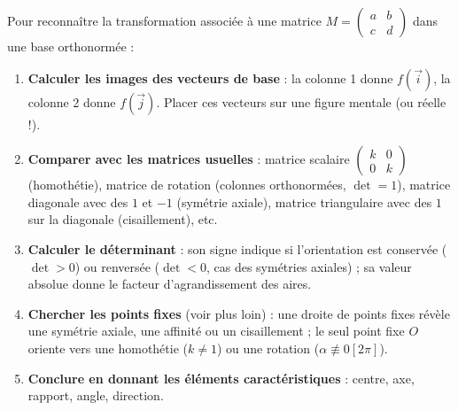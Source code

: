 \documentclass[11pt]{article}
\begin{document}
\begin{methode}
Pour reconnaître la transformation associée à une matrice $M = \begin{pmatrix} a & b \\ c & d \end{pmatrix}$ dans une base orthonormée :
\begin{enumerate}
\item \textbf{Calculer les images des vecteurs de base} : la colonne 1 donne $f(\vec{i})$, la colonne 2 donne $f(\vec{j})$. Placer ces vecteurs sur une figure mentale (ou réelle !).
\item \textbf{Comparer avec les matrices usuelles} : matrice scalaire $\begin{pmatrix} k & 0 \\ 0 & k \end{pmatrix}$ (homothétie), matrice de rotation (colonnes orthonormées, $\det=1$), matrice diagonale avec des $1$ et $-1$ (symétrie axiale), matrice triangulaire avec des $1$ sur la diagonale (cisaillement), etc.
\item \textbf{Calculer le déterminant} : son signe indique si l'orientation est conservée ($\det > 0$) ou renversée ($\det < 0$, cas des symétries axiales) ; sa valeur absolue donne le facteur d'agrandissement des aires.
\item \textbf{Chercher les points fixes} (voir plus loin) : une droite de points fixes révèle une symétrie axiale, une affinité ou un cisaillement ; le seul point fixe $O$ oriente vers une homothétie ($k\neq 1$) ou une rotation ($\alpha\not\equiv 0[2\pi]$).
\item \textbf{Conclure en donnant les éléments caractéristiques} : centre, axe, rapport, angle, direction.
\end{enumerate}
\end{methode}
\end{document}
